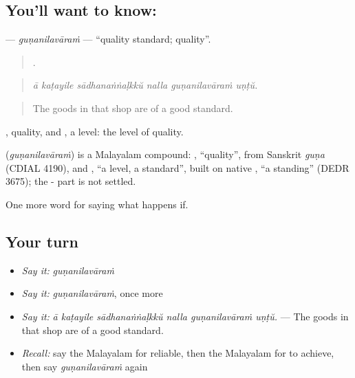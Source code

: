 \subsection*{You'll want to know: }
\textbf{} — \emph{guṇanilavāraṁ} — \textquotedblleft{}quality standard; quality\textquotedblright{}.

\begin{quote}
     .
\end{quote}

\begin{quote}
\emph{ā kaṭayile sādhanaṅṅaḷkkŭ nalla guṇanilavāraṁ uṇṭŭ.}
\end{quote}

\begin{quote}
The goods in that shop are of a good standard.
\end{quote}

, quality, and , a level: the level of quality.

\begin{cousinweb}
\textbf{} (\emph{guṇanilavāraṁ}) is a Malayalam compound: , \textquotedblleft{}quality\textquotedblright{}, from Sanskrit \emph{guṇa} (CDIAL 4190), and , \textquotedblleft{}a level, a standard\textquotedblright{}, built on native , \textquotedblleft{}a standing\textquotedblright{} (DEDR 3675); the - part is not settled.
\end{cousinweb}

\begin{grammarlens}[title={What you've built}]
One more word for saying what happens if.
\end{grammarlens}

\subsection*{Your turn}
\begin{itemize}
\raggedright
  \item \emph{Say it:} \emph{guṇanilavāraṁ}
  \item \emph{Say it:} \emph{guṇanilavāraṁ}, once more
  \item \emph{Say it:} \emph{ā kaṭayile sādhanaṅṅaḷkkŭ nalla guṇanilavāraṁ uṇṭŭ.} — The goods in that shop are of a good standard.
  \item \emph{Recall:} say the Malayalam for reliable, then the Malayalam for to achieve, then say \emph{guṇanilavāraṁ} again
\end{itemize}


